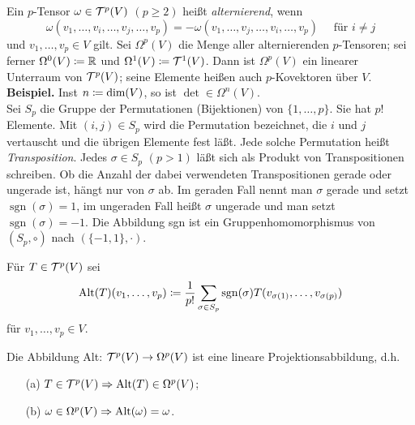 \documentclass[a4paper,twoside,DIV15,BCOR12mm]{scrbook}
\DeclareMathOperator{\sgn}{sgn}
\begin{document}
\bigskip

 Ein $p$-Tensor $\omega \in {\cal 
T}^{p}(V)$ $(p \ge 2)$ heißt {\em alternierend}, wenn
\[ \omega(v_{1},\dots,v_{i},\dots,v_{j},\dots,v_{p}) = 
-\omega(v_{1},\dots,v_{j},\dots,v_{i},\dots,v_{p}) \quad \mbox{ für } 
i \not= j \]
und $v_{1},\dots,v_{p} \in V$ gilt. Sei $\Omega^{p}(V)$ die Menge 
aller alternierenden $p$-Tensoren; sei ferner $\Omega^{0}(V) \da  
{\mathbb R}$ und $\Omega^{1}(V) \da  {\cal T}^{1}(V)$. Dann ist 
$\Omega^{p}(V)$ ein linearer Unterraum von ${\cal T}^{p}(V)$; seine 
Elemente heißen auch $p$-Kovektoren über $V$.\\

\noindent
{\bf Beispiel.} Inst $n\da \text{dim}(V)$, so ist $\det\in\Omega^n(V)$.\\

\noindent
Sei $S_{p}$ die Gruppe der Permutationen (Bijektionen) von 
$\{1,\dots,p\}$. Sie hat $p!$ Elemente. Mit $(i,j) \in S_{p}$ wird die 
Permutation bezeichnet, die $i$ und $j$ vertauscht und die übrigen 
Elemente fest läßt. Jede solche Permutation heißt {\em 
Transposition}. Jedes $\sigma \in S_{p}$ $(p > 1)$ läßt sich als 
Produkt von Transpositionen schreiben. Ob die Anzahl der dabei 
verwendeten Transpositionen gerade oder ungerade ist, hängt nur von 
$\sigma$ ab. Im geraden Fall nennt man $\sigma$ gerade und setzt $\sgn(\sigma) = 1$, im ungeraden Fall heißt $\sigma$ ungerade und man 
setzt $\sgn (\sigma) = -1$. Die Abbildung sgn ist ein 
Gruppenhomomorphismus von $(S_{p},\circ)$ nach $(\{-1,1\},\cdot)$.

\bigskip

 Für $T \in {\cal T}^{p}(V)$ sei
\[ {\rm Alt}(T)(v_{1},\dots,v_{p}) \da  \frac{1}{p!} \sum_{\sigma \in 
S_{p}} \sgn (\sigma) T(v_{\sigma(1)},\dots,v_{\sigma(p)}) \]
für $v_1,\ldots,v_p\in V$.\\

\bigskip

\begin{satz}\label{Satz3.3.2} {Die Abbildung {\rm Alt}: ${\cal T}^{p}(V) 
\to \Omega^{p}(V)$ ist eine lineare Projektionsabbildung, d.h.}
\begin{enumerate}
\item[{\rm (a)}] $T \in {\cal T}^{p}(V) \Rightarrow {\rm Alt}(T) \in 
\Omega^{p}(V)$;
\item[{\rm (b)}] $\omega \in \Omega^{p}(V) \Rightarrow {\rm Alt}(\omega) = \omega$.
\end{enumerate}
\end{satz}
\end{document}
